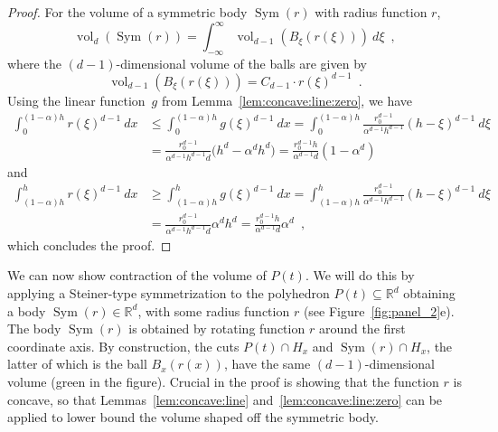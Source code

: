 \documentclass[a4paper,USenglish]{lipics-v2021}
\DeclareMathOperator{\vol}{vol}
\DeclareMathOperator{\Sym}{Sym}
\newcommand{\IR}{\mathbb{R}}
\newcommand{\Ball}{B}
\renewcommand{\leq}{\leqslant}
\renewcommand{\geq}{\geqslant}
\begin{document}
\begin{proof}
	For the volume of a symmetric body $\Sym(r)$ with radius function $r$,
	\[
		\vol_d(\Sym(r)) = \int_{-\infty}^{\infty}\vol_{d-1}\left( \Ball_\xi(r(\xi)) \right) \ d\xi\enspace,
	\]
	where the $(d-1)$-dimensional volume of the balls are given by
	\begin{equation}
		\vol_{d-1}\left( \Ball_\xi(r(\xi)) \right) = C_{d-1} \cdot r(\xi)^{d-1} \enspace. \label{eq:vol:b}
	\end{equation}
	Using the linear function~$g$ from Lemma~\ref{lem:concave:line:zero}, we have
	\begin{equation*}
		\begin{split}
			\int_0^{(1-\alpha)h} r(\xi)^{d-1} \ dx
			& \leq
			\int_0^{(1-\alpha)h} g(\xi)^{d-1} \ dx
			=
			\int_0^{(1-\alpha)h} \frac{r_0^{d-1}}{\alpha^{d-1}h^{d-1}} (h-\xi)^{d-1} \ d\xi
			\\ & =
			\frac{r_0^{d-1}}{\alpha^{d-1}h^{d-1}d} \big(h^d - \alpha^d h^d\big)
			=
			\frac{r_0^{d-1}h}{\alpha^{d-1}d} \left(1 - \alpha^d\right)
		\end{split}
	\end{equation*}
	and
	\begin{equation*}
		\begin{split}
			\int_{(1-\alpha)h}^h r(\xi)^{d-1} \ dx
			& \geq
			\int_{(1-\alpha)h}^h g(\xi)^{d-1} \ dx
			=
			\int_{(1-\alpha)h}^h \frac{r_0^{d-1}}{\alpha^{d-1}h^{d-1}} (h-\xi)^{d-1} \ d\xi
			\\ & =
			\frac{r_0^{d-1}}{\alpha^{d-1}h^{d-1}d} \alpha^d h^d
			=
			\frac{r_0^{d-1}h}{\alpha^{d-1}d} \alpha^d
			\enspace,
		\end{split}
	\end{equation*}
	which concludes the proof.
\end{proof}

We can now show contraction of the volume of $P(t)$.
We will do this by applying a Steiner-type symmetrization to the polyhedron $P(t) \subseteq \IR^d$
obtaining a body $\Sym(r) \in \IR^d$, with some radius function $r$ (see Figure~\ref{fig:panel_2}e).
The body $\Sym(r)$ is obtained by rotating function $r$ around the first coordinate axis.
By construction, the cuts $P(t) \cap H_x$ and $\Sym(r) \cap H_x$, the latter of which is the ball $\Ball_x(r(x))$, have the same $(d-1)$-dimensional volume (green in the figure).
Crucial in the proof is showing that the function $r$ is concave, so that Lemmas~\ref{lem:concave:line} and~\ref{lem:concave:line:zero} can be applied to lower bound the volume shaped off the symmetric body.
\end{document}
